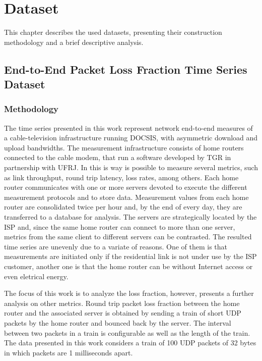 \chapter{Dataset}

This chapter describes the used datasets, presenting their construction methodology and a brief descriptive analysis.

\section{End-to-End Packet Loss Fraction Time Series Dataset}

\subsection{Methodology}

The time series presented in this work represent network end-to-end measures of a cable-television infrastructure running DOCSIS, with asymmetric download and upload bandwidths. The measurement infrastructure consists of home routers connected to the cable modem, that run a software developed by TGR in partnership with UFRJ. In this is way is possible to measure several metrics, such as link throughput, round trip latency, loss rates, among others. Each home router communicates with one or more servers devoted to execute the different measurement protocols and to store data. Measurement values from each home router are consolidated twice per hour and, by the end of every day, they are transferred to a database for analysis. The servers are strategically located by the ISP and, since the same home router can connect to more than one server, metrics from the same client to different servers can be contrasted. The resulted time series are unevenly due to a variate of reasons. One of them is that measurements are initiated only if the residential link is not under use by the ISP customer, another one is that the home router can be without Internet access or even eletrical energy.

The focus of this work is to analyze the loss fraction, however, \cite{a_preliminary_performance_measurement_study_of_residential_broadband_services_in_brazil} presents a further analysis on other metrics. Round trip packet loss fraction between the home router and the associated server is obtained by sending a train of short UDP packets by the home router and bounced back by the server. The interval between two packets in a train is configurable as well as the length of the train. The data presented in this work considers a train of 100 UDP packets of 32 bytes in which packets are 1 milliseconds apart.

